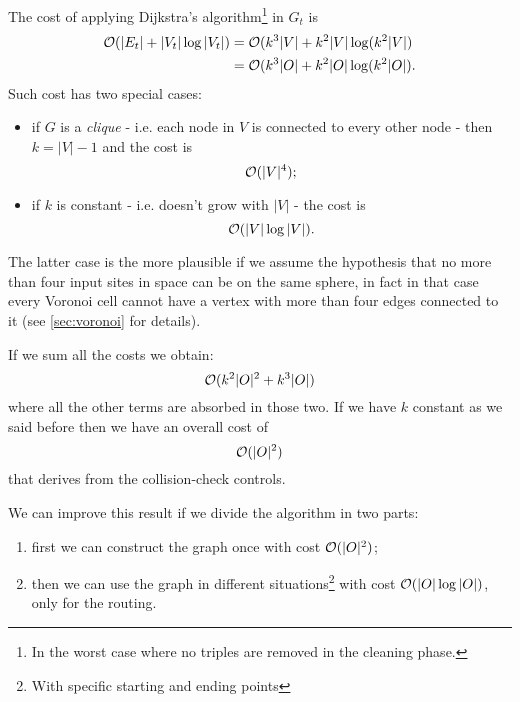 \documentclass[dissertation.tex]{subfiles}
\begin{document}
The cost of applying Dijkstra's algorithm\footnote{In the worst case
  where no triples are removed in the cleaning phase.} in $G_t$ is \cite{bondy}\cite{lavalle}
\newcommand{\eqCostDijkstraTriples}{\ensuremath{\bigO(k^3|\obsSet|+k^2|\obsSet|\log(k^2|\obsSet|)}}
\begin{equation}
  \label{eq:costDijkstraTriples}
  \begin{split}
    \bigO(|E_t|+|V_t|\log |V_t|) &= \bigO(k^3|V|+k^2|V|\log(k^2|V|)\\
    &= \eqCostDijkstraTriples.
  \end{split}
\end{equation}
Such cost has two special cases:
\begin{itemize}
\item if $G$ is a \emph{clique} - i.e. each
  node in $V$ is connected to every other node \cite{bondy} - then
  $k=|V|-1$ and the cost is
  \begin{equation*}
    \mathcal{O}(|V|^4);
  \end{equation*}
\item if $k$ is constant - i.e. doesn't grow with $|V|$ - the
  cost is
  \begin{equation*}
    \mathcal{O}(|V|\log|V|).
  \end{equation*}
\end{itemize}
The latter case is the more plausible if we assume the hypothesis that
no more than four input sites in space can be on the
same sphere, in fact in that case
every Voronoi cell cannot have a vertex with more than four edges
connected to it (see \cref{sec:voronoi} for details).

If we sum all the costs we obtain:
\newcommand{\eqCostTotalOne}{\ensuremath{\bigO(k^2|\obsSet|^2+k^3|\obsSet|)}}
\begin{equation}\label{eq:costTotalOne}
  \eqCostTotalOne
\end{equation}
where all the other terms are absorbed in those two. If we have $k$
constant as we said before then we have an overall cost of
\newcommand{\eqCostTotalOneK}{\ensuremath{\bigO(|\obsSet|^2)}}
\begin{equation}\label{eq:costTotalOneK}
  \eqCostTotalOneK
\end{equation}
that derives from the collision-check controls.

We can improve
this result if we divide the algorithm in two parts:
\begin{enumerate}
\item first we 
  can construct the graph once with cost $\mathcal{O}(|O|^2)$;
\item then we can
  use the graph in different situations\footnote{With specific starting
    and ending points} with cost $\mathcal{O}(|O|\log |O|)$, only for the
  routing.
\end{enumerate}
\end{document}
